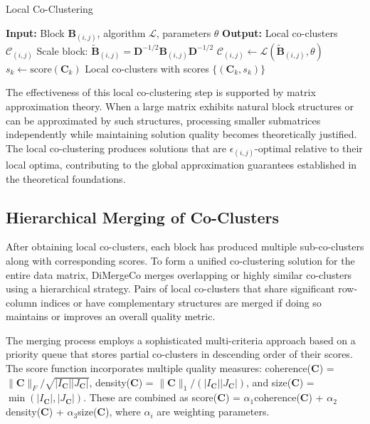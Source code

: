 \documentclass[journal]{IEEEtran}
\begin{document}
\begin{algorithm}[t]
    \caption{Local Co-Clustering}
    \label{alg:local_co_clustering}
    \begin{algorithmic}
        \STATE \textbf{Input:} Block $\mathbf{B}_{(i,j)}$, algorithm $\mathcal{L}$, parameters $\theta$
        \STATE \textbf{Output:} Local co-clusters $\mathcal{C}_{(i,j)}$
        \STATE Scale block: $\tilde{\mathbf{B}}_{(i,j)} = \mathbf{D}^{-1/2}\mathbf{B}_{(i,j)}\mathbf{D}^{-1/2}$
        \STATE $\mathcal{C}_{(i,j)} \leftarrow \mathcal{L}(\tilde{\mathbf{B}}_{(i,j)}, \theta)$
        \STATE $s_k \leftarrow \text{score}(\mathbf{C}_k)$
        \ENDFOR
        \RETURN Local co-clusters with scores $\{(\mathbf{C}_k, s_k)\}$
    \end{algorithmic}
\end{algorithm}

The effectiveness of this local co-clustering step is supported by matrix approximation theory. When a large matrix exhibits natural block structures or can be approximated by such structures, processing smaller submatrices independently while maintaining solution quality becomes theoretically justified. The local co-clustering produces solutions that are $\epsilon_{(i,j)}$-optimal relative to their local optima, contributing to the global approximation guarantees established in the theoretical foundations.

\subsection{Hierarchical Merging of Co-Clusters}
\label{subsec:hierarchical_merging}
After obtaining local co-clusters, each block has produced multiple sub-co-clusters along with corresponding scores. To form a unified co-clustering solution for the entire data matrix, DiMergeCo merges overlapping or highly similar co-clusters using a hierarchical strategy. Pairs of local co-clusters that share significant row-column indices or have complementary structures are merged if doing so maintains or improves an overall quality metric.

The merging process employs a sophisticated multi-criteria approach based on a priority queue that stores partial co-clusters in descending order of their scores. The score function incorporates multiple quality measures: coherence($\mathbf{C}$) = $\|\mathbf{C}\|_F/\sqrt{|I_{\mathbf{C}}||J_{\mathbf{C}}|}$, density($\mathbf{C}$) = $\|\mathbf{C}\|_1/(|I_{\mathbf{C}}||J_{\mathbf{C}}|)$, and size($\mathbf{C}$) = $\min(|I_{\mathbf{C}}|, |J_{\mathbf{C}}|)$. These are combined as score($\mathbf{C}$) = $\alpha_1$coherence($\mathbf{C}$) + $\alpha_2$density($\mathbf{C}$) + $\alpha_3$size($\mathbf{C}$), where $\alpha_i$ are weighting parameters.
\end{document}
